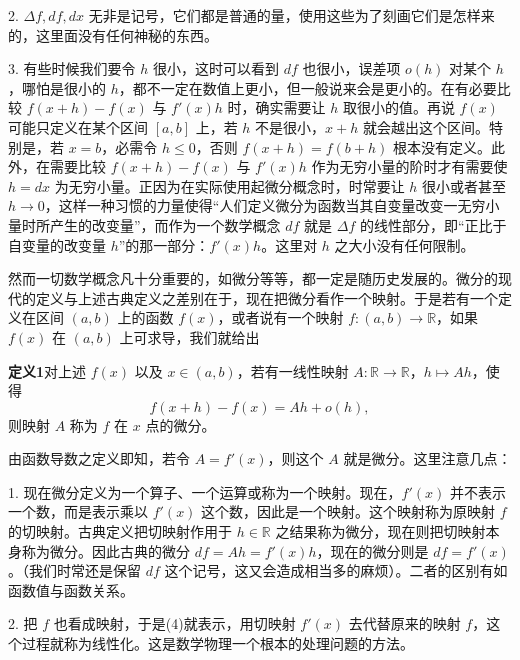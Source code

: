 2. $\Delta f,df,dx$ 无非是记号，它们都是普通的量，使用这些为了刻画它们是怎样来的，这里面没有任何神秘的东西。

3. 有些时候我们要令 $h$ 很小，这时可以看到 $df$ 也很小，误差项 $o(h)$ 对某个 $h$，哪怕是很小的 $h$，都不一定在数值上更小，但一般说来会是更小的。在有必要比较 $f(x+h)-f(x)$ 与 $f'(x)h$ 时，确实需要让 $h$ 取很小的值。再说 $f(x)$ 可能只定义在某个区间 $[a,b]$ 上，若 $h$ 不是很小，$x+h$ 就会越出这个区间。特别是，若 $x=b$，必需令 $h\le0$，否则 $f(x+h)=f(b+h)$ 根本没有定义。此外，在需要比较 $f(x+h)-f(x)$ 与 $f'(x)h$ 作为无穷小量的阶时才有需要使 $h=dx$ 为无穷小量。正因为在实际使用起微分概念时，时常要让 $h$ 很小或者甚至 $h\to0$，这样一种习惯的力量使得“人们定义微分为函数当其自变量改变一无穷小量时所产生的改变量”，而作为一个数学概念 $df$ 就是 $\Delta f$ 的线性部分，即“正比于自变量的改变量 $h$”的那一部分：$f'(x)h$。这里对 $h$ 之大小没有任何限制。

然而一切数学概念凡十分重要的，如微分等等，都一定是随历史发展的。微分的现代的定义与上述古典定义之差别在于，现在把微分看作一个映射。于是若有一个定义在区间 $(a,b)$ 上的函数 $f(x)$，或者说有一个映射 $f:(a,b)\to\mathbb R$，如果 $f(x)$ 在 $(a,b)$ 上可求导，我们就给出

\noindent\textbf{定义1}\quad 对上述 $f(x)$ 以及 $x\in(a,b)$，若有一线性映射 $A:\mathbb R\to\mathbb R$，$h\mapsto Ah$，使得
\begin{equation}
 f(x+h)-f(x)=Ah+o(h),
 \tag{4}
\end{equation}
则映射 $A$ 称为 $f$ 在 $x$ 点的微分。

由函数导数之定义即知，若令 $A=f'(x)$，则这个 $A$ 就是微分。这里注意几点：

1. 现在微分定义为一个算子、一个运算或称为一个映射。现在，$f'(x)$ 并不表示一个数，而是表示乘以 $f'(x)$ 这个数，因此是一个映射。这个映射称为原映射 $f$ 的切映射。古典定义把切映射作用于 $h\in\mathbb R$ 之结果称为微分，现在则把切映射本身称为微分。因此古典的微分 $df=Ah=f'(x)h$，现在的微分则是 $df=f'(x)$。（我们时常还是保留 $df$ 这个记号，这又会造成相当多的麻烦）。二者的区别有如函数值与函数关系。

2. 把 $f$ 也看成映射，于是(4)就表示，用切映射 $f'(x)$ 去代替原来的映射 $f$，这个过程就称为线性化。这是数学物理一个根本的处理问题的方法。

